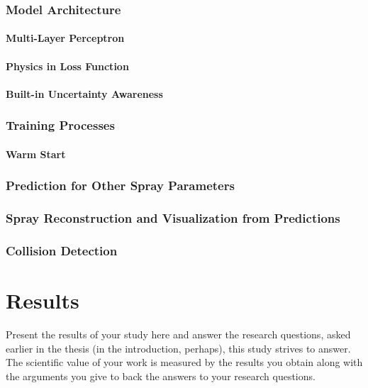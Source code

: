 \documentclass[english, 12pt, a4paper, elec, utf8, a-2b, online]{aaltothesis}
\begin{document}
\subsubsection{Model Architecture}
\paragraph{Multi-Layer Perceptron}
\paragraph{Physics in Loss Function}
\paragraph{Built-in Uncertainty Awareness}

\subsubsection{Training Processes}
\paragraph{Warm Start}

\subsubsection{Prediction for Other Spray Parameters}

\subsubsection{Spray Reconstruction and Visualization from Predictions}
\subsubsection{Collision Detection}



\clearpage

\section{Results}

Present the results of your study here and answer the research questions, asked 
earlier in the thesis (in the introduction, perhaps), this study strives to 
answer. The scientific value of your work is measured by the results you obtain 
along with the arguments you give to back the answers to your research 
questions.
\end{document}
